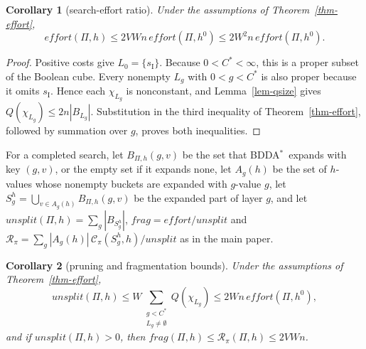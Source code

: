 \documentclass[letterpaper]{article}
\newcommand{\task}{\ensuremath{\Pi}}
\newcommand{\sinit}{\ensuremath{s_{\mathrm{I}}}}
\newcommand{\hblind}{\ensuremath{h^{0}}}
\newcommand{\copt}{\ensuremath{C^{*}}}
\newcommand{\bddsize}[1]{\ensuremath{|B_{#1}|}}
\newcommand{\cofcount}{\ensuremath{Q}}
\newcommand{\cutprod}[2]{\ensuremath{\mathcal{C}_{\pi}(#1,#2)}}
\newcommand{\values}{\ensuremath{V}}
\newcommand{\effort}{\ensuremath{\mathit{effort}}}
\newcommand{\unioneffort}{\ensuremath{\mathit{unsplit}}}
\newcommand{\fragfactor}{\ensuremath{\mathit{frag}}}
\newcommand{\profilescore}{\ensuremath{\mathcal{R}_{\pi}}}
\newcommand{\bddastar}{BDDA\ensuremath{^{*}}}
\theoremstyle{plain}
\newtheorem{corollary}{Corollary}
\theoremstyle{definition}
\theoremstyle{remark}
\begin{document}
\begin{corollary}[search-effort ratio]
\label{cor-effort}
Under the assumptions of Theorem~\ref{thm-effort},
\begin{equation}
 \effort(\task,h)
 \leq2\values Wn\,\effort(\task,\hblind)
 \leq2W^2n\,\effort(\task,\hblind).
 \label{eq-supp-effort-ratio}
\end{equation}
\end{corollary}

\begin{proof}
Positive costs give $L_0=\{\sinit\}$. Because
$0<\copt<\infty$, this is a proper subset of the Boolean cube. Every
nonempty $L_g$ with $0<g<\copt$ is also proper because it omits
\sinit. Hence each $\chi_{L_g}$ is nonconstant, and
Lemma~\ref{lem-qsize} gives
$\cofcount(\chi_{L_g})\leq2n\bddsize{L_g}$. Substitution in the third
inequality of Theorem~\ref{thm-effort}, followed by summation over $g$,
proves both inequalities.
\end{proof}

For a completed search, let $B_{\task,h}(g,v)$ be the set that \bddastar\
expands with key $(g,v)$, or the empty set if it expands none, let $A_g(h)$
be the set of $h$-values whose nonempty buckets are expanded with $g$-value
$g$, let
$S_g^h=\bigcup_{v\in A_g(h)}B_{\task,h}(g,v)$ be the expanded part of layer
$g$, and let $\unioneffort(\task,h)=\sum_g\bddsize{S_g^h}$,
$\fragfactor=\effort/\unioneffort$ and
$\profilescore=\sum_g|A_g(h)|\,\cutprod{S_g^h}{h}/\unioneffort$ as in the main
paper.

\begin{corollary}[pruning and fragmentation bounds]
\label{cor-unsplit-frag}
Under the assumptions of Theorem~\ref{thm-effort},
\[
 \unioneffort(\task,h)\leq W\!\!\sum_{\substack{g<\copt\\L_g\ne\emptyset}}\!\!\cofcount(\chi_{L_g})
 \leq2Wn\,\effort(\task,\hblind),
\]
and if $\unioneffort(\task,h)>0$, then
$\fragfactor(\task,h)\leq\profilescore(\task,h)\leq2\values Wn$.
\end{corollary}
\end{document}
